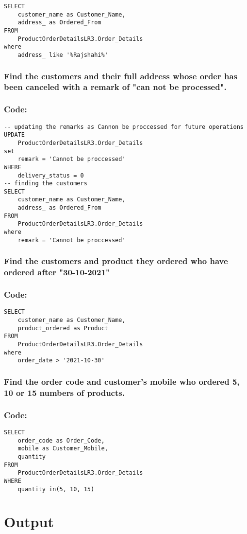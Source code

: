 \documentclass[12pt]{article}
\begin{document}
\begin{verbatim}
SELECT
    customer_name as Customer_Name,
    address_ as Ordered_From
FROM
    ProductOrderDetailsLR3.Order_Details
where
    address_ like '%Rajshahi%'
\end{verbatim}



\vspace{13mm}

\subsubsection{Find the customers and their full address whose order has been canceled with a remark of "can not be processed".}
\subsubsection*{Code:}
\begin{verbatim}
-- updating the remarks as Cannon be proccessed for future operations
UPDATE
    ProductOrderDetailsLR3.Order_Details
set
    remark = 'Cannot be proccessed'
WHERE
    delivery_status = 0
-- finding the customers
SELECT
    customer_name as Customer_Name,
    address_ as Ordered_From
FROM
    ProductOrderDetailsLR3.Order_Details
where
    remark = 'Cannot be proccessed'
\end{verbatim}

\vspace{13mm}
\pagebreak
\subsubsection{Find the customers and product they ordered who have ordered after "30-10-2021"}
\subsubsection*{Code:}
\begin{verbatim}
SELECT
    customer_name as Customer_Name,
    product_ordered as Product
FROM
    ProductOrderDetailsLR3.Order_Details
where
    order_date > '2021-10-30'
\end{verbatim}

\vspace{13mm}

\subsubsection{Find the order code and customer's mobile who ordered 5, 10 or 15 numbers of products.}
\subsubsection*{Code:}
\begin{verbatim}
SELECT
    order_code as Order_Code,
    mobile as Customer_Mobile,
    quantity
FROM
    ProductOrderDetailsLR3.Order_Details
WHERE
    quantity in(5, 10, 15)
\end{verbatim}

\vspace{13mm}

\section{Output}

\end{document}
